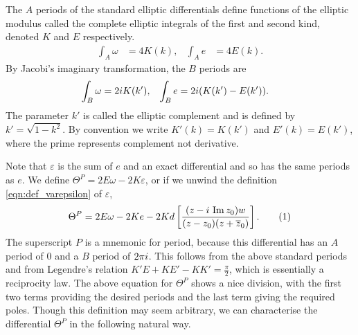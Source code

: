 \documentclass{article}
\begin{document}


The $A$ periods of the standard elliptic differentials define functions of the elliptic modulus called the complete elliptic integrals of the first and second kind, denoted $K$ and $E$ respectively.
\begin{align*}
    \int_{A} \omega &= 4K(k), &
    \int_{A} e &= 4E(k).
\end{align*}
By Jacobi's imaginary transformation,
the $B$ periods are
\begin{align*}
\int_{B} \omega &= 2i K(k'), &
\int_{B} e &= 2i(K(k')-E(k')).
\end{align*}
The parameter $k'$ is called the elliptic complement and is defined by $k' = \sqrt{1-k^2}$. By convention we write $K'(k) = K(k')$ and $E'(k) = E(k')$, where the prime represents complement not derivative. 

Note that $\varepsilon$ is the sum of $e$ and an exact differential and so has the same periods as $e$. We define $\Theta^P = 2E\omega - 2K\varepsilon$, or if we unwind the definition \eqref{eqn:def_varepsilon} of $\varepsilon$,
\[
\Theta^P = 2E \omega - 2Ke - 2K d\left[ \frac{(z-\iu\,\Imag z_0)w}{(z-z_0)(z + \bar{z}_0)} \right].
\labelthis{eqn:thetaP}
\]
The superscript $P$ is a mnemonic for period, because this differential has an $A$ period of $0$ and a $B$ period of $2\pi i$. This follows from the above standard periods and from Legendre's relation $K'E + KE' - KK' = \frac{\pi}{2}$,
which is essentially a reciprocity law.
The above equation for $\Theta^P$ shows a nice division, with the first two terms providing the desired periods and the last term giving the required poles. Though this definition may seem arbitrary, we can characterise the differential $\Theta^P$ in the following natural way.
\end{document}
